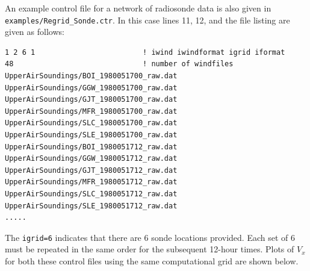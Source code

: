 \documentclass[11pt]{article}   %
\begin{document}
An example control file for a network of radiosonde data is also given in
\texttt{examples/Regrid\_Sonde.ctr}.  In this case lines 11, 12, and the file listing are given as
follows:
\footnotesize
\begin{verbatim}
1 2 6 1                         ! iwind iwindformat igrid iformat
48                              ! number of windfiles
UpperAirSoundings/BOI_1980051700_raw.dat
UpperAirSoundings/GGW_1980051700_raw.dat
UpperAirSoundings/GJT_1980051700_raw.dat
UpperAirSoundings/MFR_1980051700_raw.dat
UpperAirSoundings/SLC_1980051700_raw.dat
UpperAirSoundings/SLE_1980051700_raw.dat
UpperAirSoundings/BOI_1980051712_raw.dat
UpperAirSoundings/GGW_1980051712_raw.dat
UpperAirSoundings/GJT_1980051712_raw.dat
UpperAirSoundings/MFR_1980051712_raw.dat
UpperAirSoundings/SLC_1980051712_raw.dat
UpperAirSoundings/SLE_1980051712_raw.dat
.....
\end{verbatim}
\normalsize
The \texttt{igrid=6} indicates that there are 6 sonde locations provided.  Each set of 6
must be repeated in the same order for the subsequent 12-hour times.  Plots of $V_x$ for
both these control files using the same computational grid are shown below.
\end{document}
